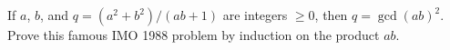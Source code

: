 If $a$, $b$, and $q = (a^2 + b^2)/(ab + 1)$ are integers $\geq 0$, then $q = \gcd(ab)^2$. Prove this famous IMO 1988 problem by induction on the product $ab$.
